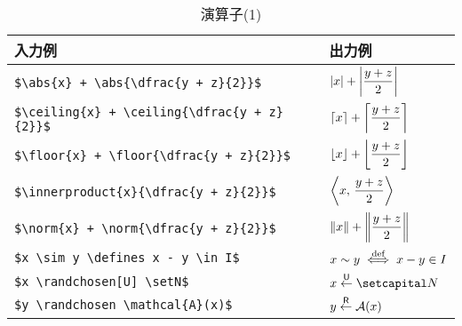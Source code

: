 \documentclass[uplatex]{jsreport}
\begin{document}
\begin{table}[htbp]
  \centering
  \caption{演算子(1)}
  \label{table:2.operaor1}
  \renewcommand{\arraystretch}{1.5}
  \begin{tabular}{ll}\hline
    入力例 & 出力例 \\ \hline 
    \verb|$\abs{x} + \abs{\dfrac{y + z}{2}}$| & $\abs{x} + \abs{\dfrac{y + z}{2}}$ \\
    \verb|$\ceiling{x} + \ceiling{\dfrac{y + z}{2}}$| & $\ceiling{x} + \ceiling{\dfrac{y + z}{2}}$ \\
    \verb|$\floor{x} + \floor{\dfrac{y + z}{2}}$| & $\floor{x} + \floor{\dfrac{y + z}{2}}$ \\
    \verb|$\innerproduct{x}{\dfrac{y + z}{2}}$| & $\innerproduct{x}{\dfrac{y + z}{2}}$ \\
    \verb|$\norm{x} + \norm{\dfrac{y + z}{2}}$| & $\norm{x} + \norm{\dfrac{y + z}{2}}$ \\
    \verb|$x \sim y \defines x - y \in I$|& $x \sim y \overset{\text{def}}{\iff} x - y \in I$ \\
    \verb|$x \randchosen[U] \setN$| & $x \randchosen[U] \setN$ \\
    \verb|$y \randchosen \mathcal{A}(x)$| & $y \randchosen \mathcal{A}(x)$ \\\hline
  \end{tabular}\par
\end{table}\par
\end{document}
